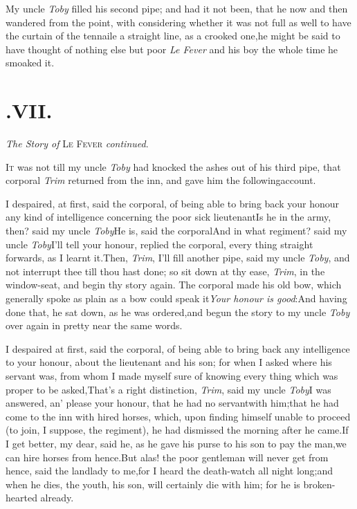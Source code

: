 \documentclass{article}
\begin{document}
My uncle \textit{Toby} filled his second pipe; and had it not
been, that he now and then wandered from the point, with
considering whether it was not full as well to have the curtain of the tennaile a straight
line, as a crooked one,\tsk he might be said to have thought of
nothing else but poor \textit{Le Fever} and his boy the whole time he
smoaked it.

\newpage
\section{.\enspace VII.}

\medskip
\centerline{\textit{The Story of} \textsc{Le Fever} \textit{continued}.}

\lettrine It was not till my uncle \textit{Toby} had knocked the
ashes out of his third pipe, that corporal \textit{Trim}
returned from the inn, and gave him the following\break account.

I despaired, at first, said the corporal, of being able to bring
back your honour any kind of intelligence concerning the poor
sick lieutenant\tsk Is he in the army, then? said my uncle
\textit{Toby}\tsh He is, said the corporal\tsh And in what
regiment? said my uncle \textit{Toby}\tsh I’ll tell your honour,
replied the corporal, every thing straight forwards, as I learnt
it.\tsk\break Then, \textit{Trim}, I’ll fill another pipe, said my
uncle \textit{Toby}, and not interrupt thee\pb
till thou hast done; so sit down at thy ease, \textit{Trim}, in
the window-seat, and begin thy story again. The corporal made
his old bow, which generally spoke as plain as a bow could speak
it\tsk \textit{Your honour is good}:\tsk And having done that,
he sat down, as he was ordered,\tsk\break and begun the story to my
uncle \textit{Toby} over again in pretty near the same words.

I despaired at first, said the corporal, of being able to bring
back any intelligence to your honour, about the lieutenant and his
son; for when I asked where his servant was, from whom I made
myself sure of knowing every thing which was proper to be
asked,\tsk\break That’s a right distinction, \textit{Trim}, said my
uncle \textit{Toby}\tsk I was answered, an’ please your
honour, that he had no servant\pb with him;\tsh that he had
come to the inn with hired horses, which, upon finding himself
unable to proceed (to join, I suppose, the regiment), he had
dismissed the morning after he came.\tsk If I get better, my
dear, said he, as he gave his purse to his son to pay the man,\tsk we
can hire horses from hence.\tsh But alas! the poor
gentleman will never get from hence, said the landlady to
me,\tsk for I heard the death-watch all night
long;\tsh and when he dies, the youth, his son, will
certainly die with him; for he is broken-hearted already.
\end{document}
